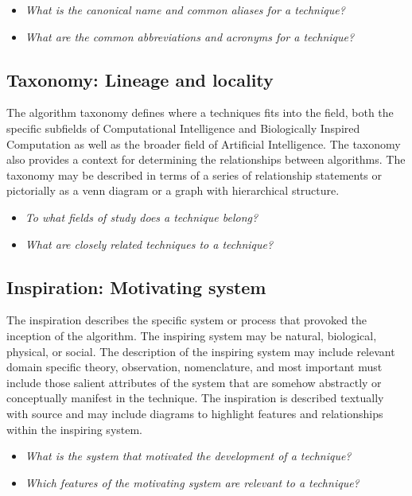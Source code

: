 \documentclass[a4paper, 11pt]{article}
\begin{document}
\begin{itemize}
	\item \emph{What is the canonical name and common aliases for a technique?}
	\item \emph{What are the common abbreviations and acronyms for a technique?}
\end{itemize}

\subsection{Taxonomy: Lineage and locality}
The algorithm taxonomy defines where a techniques fits into the field, both the specific subfields of Computational Intelligence and Biologically Inspired Computation as well as the broader field of Artificial Intelligence. The taxonomy also provides a context for determining the relationships between algorithms. The taxonomy may be described in terms of a series of relationship statements or pictorially as a venn diagram or a graph with hierarchical structure.

\begin{itemize}
	\item \emph{To what fields of study does a technique belong?}
	\item \emph{What are closely related techniques to a technique?}
\end{itemize}

\subsection{Inspiration: Motivating system}
The inspiration describes the specific system or process that provoked the inception of the algorithm. The inspiring system may be natural, biological, physical, or social. The description of the inspiring system may include relevant domain specific theory, observation, nomenclature, and most important must include those salient attributes of the system that are somehow abstractly or conceptually manifest in the technique. The inspiration is described textually with source and may include diagrams to highlight features and relationships within the inspiring system.

\begin{itemize}
	\item \emph{What is the system that motivated the development of a technique?}
	\item \emph{Which features of the motivating system are relevant to a technique?}
\end{itemize}
\end{document}
